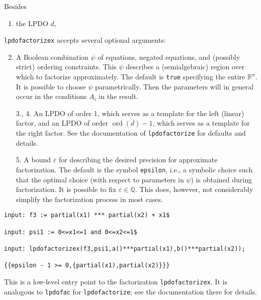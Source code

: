 Besides
\begin{enumerate}
\item the LPDO $d$,
\end{enumerate}
\texttt{lpdofactorizex} accepts several optional arguments:
\begin{enumerate}
\setcounter{enumi}{1}
\item A Boolean combination $\psi$ of equations, negated equations, and
  (possibly strict) ordering constraints. This $\psi$ describes a
  (semialgebraic) region over which to factorize approximately. The
  default is \texttt{true} specifying the entire $\mathbb{R}^n$. It is possible
  to choose $\psi$ parametrically. Then the parameters will in general
  occur in the conditions $A_i$ in the result.
\item[3., 4.] An LPDO of order 1, which serves as a template for the left
  (linear) factor, and an LPDO of order $\operatorname{ord}(d)-1$, which
  serves as a template for the right factor. See the documentation of
  \texttt{lpdofactorize} for defaults and details.
\item[5.] A bound $\varepsilon$ for describing the desired precision for
  approximate factorization. The default is the symbol \texttt{epsilon},
  i.e., a symbolic choice such that the optimal choice (with respect to
  parameters in $\psi$) is obtained during factorization. It is possible
  to fix $\varepsilon\in\mathbb{Q}$. This does, however, not considerably
  simplify the factorization process in most cases.
\end{enumerate}

\begin{footnotesize}
\begin{verbatim}
input: f3 := partial(x1) *** partial(x2) + x1$

input: psi1 := 0<=x1<=1 and 0<=x2<=1$

input: lpdofactorizex(f3,psi1,a()***partial(x1),b()***partial(x2));

{{epsilon - 1 >= 0,{partial(x1),partial(x2)}}}
\end{verbatim}
\end{footnotesize}

This is a low-level entry point to the factorization
\texttt{lpdofactorizex}. It is analogous to \texttt{lpdofac} for
\texttt{lpdofactorize}; see the documentation there for details.


